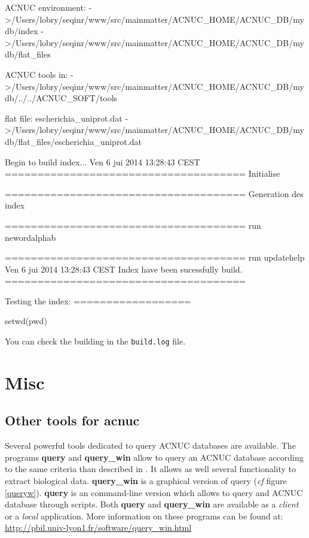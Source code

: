 \documentclass{article}
\begin{document}
\begin{itemize}
\begin{Schunk}
\begin{Soutput}
ACNUC environment:
 ->/Users/lobry/seqinr/www/src/mainmatter/ACNUC_HOME/ACNUC_DB/mydb/index
 ->/Users/lobry/seqinr/www/src/mainmatter/ACNUC_HOME/ACNUC_DB/mydb/flat_files
 
ACNUC tools in:
 ->/Users/lobry/seqinr/www/src/mainmatter/ACNUC_HOME/ACNUC_DB/mydb/../../ACNUC_SOFT/tools
 
flat file: escherichia_uniprot.dat
 ->/Users/lobry/seqinr/www/src/mainmatter/ACNUC_HOME/ACNUC_DB/mydb/flat_files/escherichia_uniprot.dat
 
Begin to build index...
Ven  6 jui 2014 13:28:43 CEST
=====================================
Initialise

=====================================
Generation des index

=====================================
run newordalphab


=====================================
run updatehelp
Ven  6 jui 2014 13:28:43 CEST
Index have been sucessfully build.
=====================================
 
Testing the index:
==================
\end{Soutput}
\begin{Sinput}
 setwd(pwd)
\end{Sinput}
\end{Schunk}
You can check the building in the \texttt{build.log} file.

\end{itemize}




\section{Misc} 

\subsection{Other tools for acnuc}

Several powerful tools dedicated to query ACNUC databases are available. 
The programs \textbf{query} and \textbf{query\_win} allow to query an ACNUC database according to the same
criteria than described  in \seqinr{}. It allows as well several functionality to extract biological data.
\textbf{query\_win} is a graphical version of query (\textit{cf} figure \ref{queryw}).
\textbf{query} is an command-line version which allows to query and ACNUC database through scripts.
Both \textbf{query} and  \textbf{query\_win} are available as a
\textit{client} or a \textit{local} application. More information on these programs can be found at:
\url{http://pbil.univ-lyon1.fr/software/query_win.html}
\end{document}
